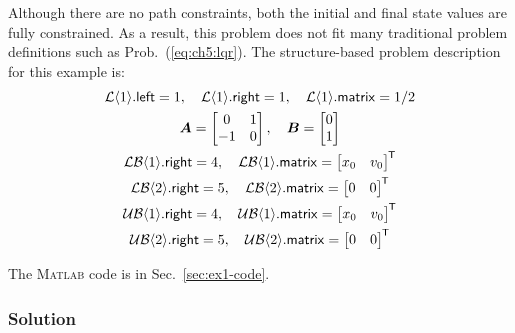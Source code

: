 \noindent Although there are no path constraints, both the initial and final state values are fully constrained. 
As a result, this problem does not fit many traditional \lqdo{} problem definitions such as Prob.~(\ref{eq:ch5:lqr}).
The structure-based problem description for this example is:%
\allowdisplaybreaks[1]%
\begin{subequations}%
\begin{gather}
\mathcal{L}\langle{1}\rangle.\textup{\textsf{left}} = 1, \quad \mathcal{L}\langle{1}\rangle.\textup{\textsf{right}} = 1, \quad \mathcal{L}\langle{1}\rangle.\textup{\textsf{matrix}} = 1/2 \\
\bm{A} = \begin{bmatrix} 0 & 1 \\ -1 & 0 \end{bmatrix}, \quad \bm{B} = \begin{bmatrix} 0 \\ 1 \end{bmatrix} \\
\mathcal{LB}\langle{1}\rangle.\textup{\textsf{right}} = 4, \quad \mathcal{LB}\langle{1}\rangle.\textup{\textsf{matrix}} = \begin{bmatrix} x_0 & v_0 \end{bmatrix}^{\mkern-1.5mu\mathsf{T}} \\
\mathcal{LB}\langle{2}\rangle.\textup{\textsf{right}} = 5, \quad \mathcal{LB}\langle{2}\rangle.\textup{\textsf{matrix}} = \begin{bmatrix} 0 & 0 \end{bmatrix}^{\mkern-1.5mu\mathsf{T}} \\
\mathcal{UB}\langle{1}\rangle.\textup{\textsf{right}} = 4, \quad \mathcal{UB}\langle{1}\rangle.\textup{\textsf{matrix}} = \begin{bmatrix} x_0 & v_0 \end{bmatrix}^{\mkern-1.5mu\mathsf{T}} \\
\mathcal{UB}\langle{2}\rangle.\textup{\textsf{right}} = 5, \quad \mathcal{UB}\langle{2}\rangle.\textup{\textsf{matrix}} = \begin{bmatrix} 0 & 0 \end{bmatrix}^{\mkern-1.5mu\mathsf{T}}
\end{gather} 
\end{subequations}%
\allowdisplaybreaks[0]

\noindent The \textsc{Matlab} code is in Sec.~\ref{sec:ex1-code}.

\subsubsection{Solution}

